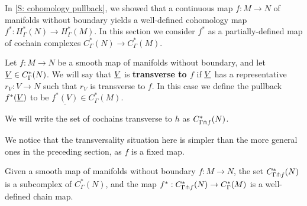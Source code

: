 In \cref{S: cohomology pullback}, we showed that a continuous map $f \colon M \to N$ of manifolds without boundary yields a well-defined cohomology map $f^* \colon H^*_\Gamma(N) \to H^*_\Gamma(M)$.
In this section we consider $f^*$ as a partially-defined map of cochain complexes $C^*_\Gamma(N) \to C^*_\Gamma(M)$.

\begin{definition}\label{D: transverse to map}
	Let $f \colon M \to N$ be a smooth map of manifolds without boundary, and let $\underline{V} \in C^*_\Gamma(N)$.
	We will say that $\underline{V}$ is \textbf{transverse to $f$} if $\underline{V}$ has a representative $r_V \colon V \to N$ such that $r_V$ is transverse to $f$.
	In this case we define the pullback $f^*(\underline{V})$ to be $\underline{f^*(V)} \in C^*_\Gamma(M)$.

	We will write the set of cochains transverse to $h$ as $C^*_{\Gamma \pitchfork f}(N)$.
\end{definition}

We notice that the transversality situation here is simpler than the more general ones in the preceding section, as $f$ is a fixed map.

\begin{proposition}
	Given a smooth map of manifolds without boundary $f \colon M \to N$, the set $C^*_{\Gamma \pitchfork f}(N)$ is a subcomplex of $C^*_{\Gamma}(N)$, and the map $f^*:C^*_{\Gamma \pitchfork f}(N) \to C^*_{\Gamma}(M)$ is a well-defined chain map.
\end{proposition}

